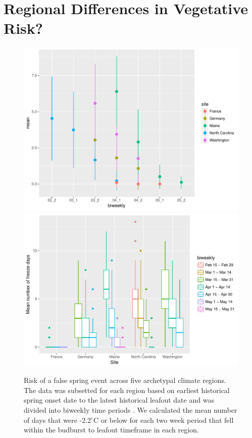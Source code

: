 \documentclass{article}\usepackage[]{graphicx}\usepackage[]{color}
\begin{document}
\section*{Regional Differences in Vegetative Risk?}
\begin{figure} [H]
\begin{center}
\caption{Risk of a false spring event across five archetypal climate regions. The data was subsetted for each region based on earliest historical spring onset date to the latest historical leafout date and was divided into biweekly time periods \citep{SI-x2016, Soudani2012, Schaber2005}. We calculated the mean number of days that were -2.2$^{\circ}$C \citep{Ault2015, Schwartz2006, Schwartz1993} or below for each two week period that fell within the budburst to leafout timeframe in each region. }
\includegraphics{..//output/RegionalRisk_by_biweekly.pdf}
\includegraphics{..//output/Boxplot_RegRisk_biweekly.pdf} 
\end{center}
\end{figure}
\end{document}
